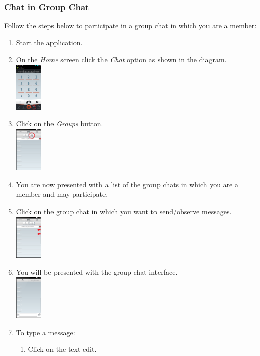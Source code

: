 \documentclass[11pt]{article}
\begin{document}
\subsubsection{Chat in Group Chat}  \label{chat}
Follow the steps below to participate in a group chat in which you are a member:
\begin{enumerate}
\item Start the application.
\item On the \textit{Home} screen click the \textit{Chat} option as shown in the diagram.\\
\includegraphics[width=50px]{images/mainScreen.png}
\item Click on the \textit{Groups} button.\\
\includegraphics[width=50px]{images/ChatlistNav.png}
\item You are now presented with a list of the group chats in which you are a member and may participate.
\item Click on the group chat in which you want to send/observe messages.\\
\includegraphics[width=50px]{images/Grouplist.png}
\item You will be presented with the group chat interface.\\
\includegraphics[width=50px]{images/groupchat.png}
\item To type a message:
\begin{enumerate}
\item Click on the text edit.\\

\end{enumerate}
\end{enumerate}
\end{document}
